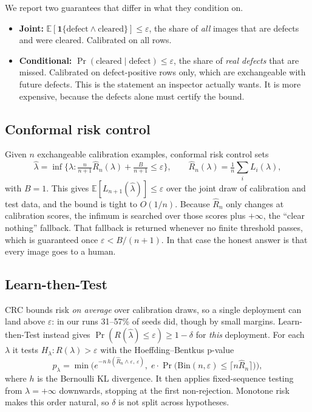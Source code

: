 We report two guarantees that differ in what they condition on.
\begin{itemize}
  \item \textbf{Joint:} $\mathbb{E}[\mathbf{1}\{\text{defect} \wedge
  \text{cleared}\}] \le \varepsilon$, the share of \emph{all} images that
  are defects and were cleared. Calibrated on all rows.
  \item \textbf{Conditional:} $\Pr(\text{cleared} \mid \text{defect}) \le
  \varepsilon$, the share of \emph{real defects} that are missed.
  Calibrated on defect-positive rows only, which are exchangeable with
  future defects. This is the statement an inspector actually wants. It is
  more expensive, because the defects alone must certify the bound.
\end{itemize}

\subsection{Conformal risk control}

Given $n$ exchangeable calibration examples, conformal risk control
\citep{angelopoulos2024crc} sets
\begin{equation}
  \hat\lambda = \inf\Big\{\lambda : \tfrac{n}{n+1}\hat R_n(\lambda) +
  \tfrac{B}{n+1} \le \varepsilon\Big\},
  \qquad \hat R_n(\lambda) = \tfrac{1}{n}\textstyle\sum_i L_i(\lambda),
\end{equation}
with $B = 1$. This gives $\mathbb{E}[L_{n+1}(\hat\lambda)] \le \varepsilon$
over the joint draw of calibration and test data, and the bound is tight to
$O(1/n)$. Because $\hat R_n$ only changes at calibration scores, the
infimum is searched over those scores plus $+\infty$, the
``clear nothing'' fallback. That fallback is returned whenever no finite
threshold passes, which is guaranteed once $\varepsilon < B/(n+1)$. In that
case the honest answer is that every
image goes to a human.

\subsection{Learn-then-Test}

CRC bounds risk \emph{on average} over calibration draws, so a single
deployment can land above $\varepsilon$: in our runs 31--57\% of seeds
did, though by small margins.
Learn-then-Test \citep{angelopoulos2021ltt} instead gives
$\Pr(R(\hat\lambda) \le \varepsilon) \ge 1 - \delta$ for \emph{this}
deployment. For each $\lambda$ it tests $H_\lambda : R(\lambda) >
\varepsilon$ with the Hoeffding--Bentkus p-value
\begin{equation}
  p_\lambda = \min\Big(e^{-n\,h(\hat R_n \wedge \varepsilon,\,
  \varepsilon)},\; e\cdot\Pr\big(\mathrm{Bin}(n, \varepsilon) \le \lceil
  n\hat R_n\rceil\big)\Big),
\end{equation}
where $h$ is the Bernoulli KL divergence. It then applies fixed-sequence
testing from $\lambda = +\infty$ downwards, stopping at the first
non-rejection. Monotone risk makes this order natural, so $\delta$ is
not split across hypotheses.

